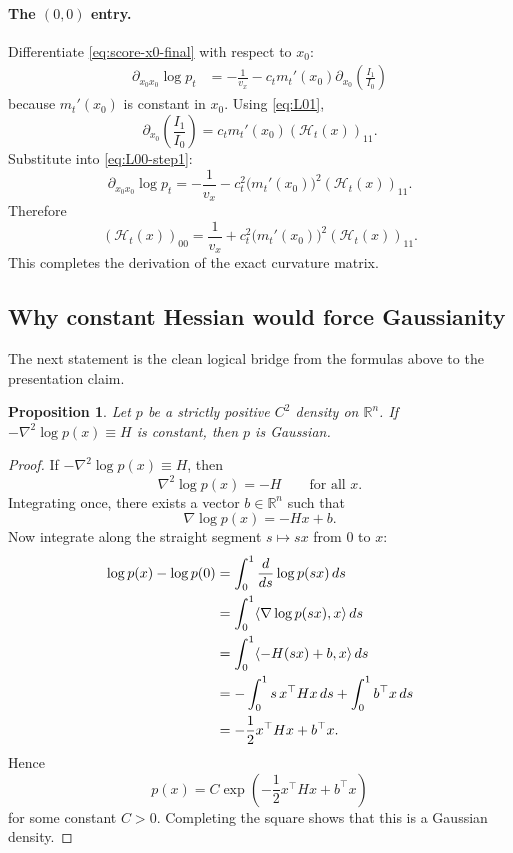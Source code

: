 \documentclass[11pt,a4paper]{article}
\newcommand{\R}{\mathbb{R}}
\newcommand{\Ht}{\mathcal{H}_t}
\newcommand{\pt}{p_t}
\newtheorem{proposition}{Proposition}
\begin{document}
\paragraph{The $(0,0)$ entry.}
Differentiate \eqref{eq:score-x0-final} with respect to $x_0$:
\begin{align}
\partial_{x_0 x_0} \log \pt
&=
-\frac{1}{v_x}
-c_t m_t'(x_0) \partial_{x_0}\left(\frac{I_1}{I_0}\right)
\label{eq:L00-step1}
\end{align}
because $m_t'(x_0)$ is constant in $x_0$. Using \eqref{eq:L01},
\[
\partial_{x_0}\left(\frac{I_1}{I_0}\right) = c_t m_t'(x_0) (\Ht(x))_{11}.
\]
Substitute into \eqref{eq:L00-step1}:
\begin{equation}
\partial_{x_0 x_0} \log \pt
=
-\frac{1}{v_x} - c_t^2 \bigl(m_t'(x_0)\bigr)^2 (\Ht(x))_{11}.
\label{eq:L00-final}
\end{equation}
Therefore
\begin{equation}
(\Ht(x))_{00}
=
\frac{1}{v_x} + c_t^2 \bigl(m_t'(x_0)\bigr)^2 (\Ht(x))_{11}.
\label{eq:H00-final}
\end{equation}
This completes the derivation of the exact curvature matrix.

\subsection{Why constant Hessian would force Gaussianity}

The next statement is the clean logical bridge from the formulas above to the presentation claim.

\begin{proposition}
Let $p$ be a strictly positive $C^2$ density on $\R^n$. If $-\nabla^2 \log p(x) \equiv H$ is constant, then $p$ is Gaussian.
\end{proposition}

\begin{proof}
If $-\nabla^2 \log p(x) \equiv H$, then
\[
\nabla^2 \log p(x) = -H
\qquad \text{for all } x.
\]
Integrating once, there exists a vector $b\in\R^n$ such that
\[
\nabla \log p(x) = -H x + b.
\]
Now integrate along the straight segment $s \mapsto s x$ from $0$ to $x$:
\begin{align}
\log p(x) - \log p(0)
&=
\int_0^1 \frac{d}{ds} \log p(sx)\, ds
\notag\\
&=
\int_0^1 \langle \nabla \log p(sx), x \rangle \, ds
\notag\\
&=
\int_0^1 \langle -H(sx)+b, x \rangle \, ds
\notag\\
&=
-\int_0^1 s \, x^\top H x \, ds + \int_0^1 b^\top x \, ds
\notag\\
&=
-\frac12 x^\top H x + b^\top x.
\label{eq:gaussianity-proof}
\end{align}
Hence
\[
p(x) = C \exp\!\left(-\frac12 x^\top H x + b^\top x\right)
\]
for some constant $C>0$. Completing the square shows that this is a Gaussian density.\qedhere
\end{proof}
\end{document}
